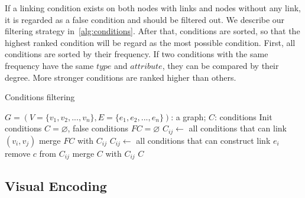 If a linking condition exists on both nodes with links and nodes without any link, it is regarded as a false condition and should be filtered out.
We describe our filtering strategy in~\ref{alg:conditions}.
After that, conditions are sorted, so that the highest ranked condition will be regard as the most possible condition.
First, all conditions are sorted by their frequency.
If two conditions with the same frequency have the same $type$ and $attribute$, they can be compared by their degree.
More stronger conditions are ranked higher than others.





\begin{algorithm}[!t]
    \renewcommand\arraystretch{1.2}
    \caption{ Conditions filtering }
    \label{alg:conditions}
    \begin{algorithmic}[1]
        \Require
            $G=(V=\{v_1, v_2, ..., v_n\}, E=\{e_1, e_2, ..., e_n\})$: a graph;
        \Ensure
            $C$: conditions
        \State Init conditions $C=\varnothing$, false conditions $FC=\varnothing$
                \State $C_{ij} \gets$ all conditions that can link $(v_i, v_j)$
                \State merge $FC$ with $C_{ij}$
            \EndIf
        \EndFor
            \State $C_{ij} \gets$ all conditions that can construct link $e_i$
                    \State remove $c$ from $C_{ij}$
                \EndIf
            \EndFor
            \State merge $C$ with $C_{ij}$
        \EndFor
        \State \Return $C$
    \end{algorithmic}
\end{algorithm}


\subsection{Visual Encoding}
